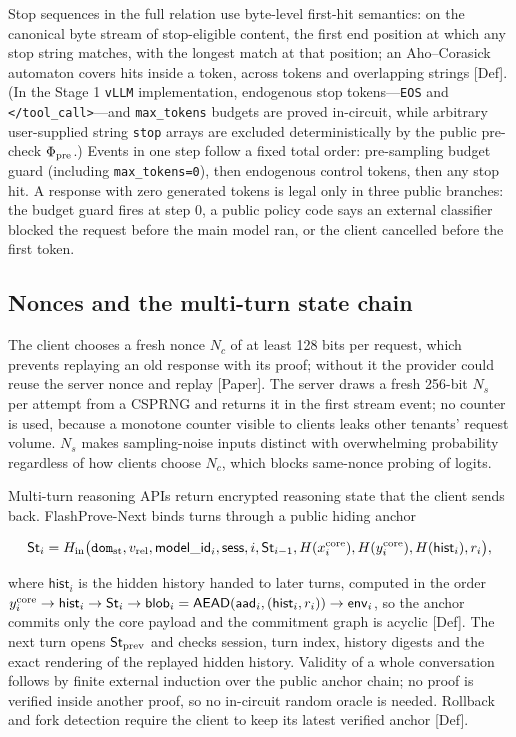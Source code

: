 \documentclass[10pt]{article}
\begin{document}
Stop sequences in the full relation use byte-level first-hit semantics: on the canonical byte stream of stop-eligible content, the first end position at which any stop string matches, with the longest match at that position; an Aho--Corasick automaton covers hits inside a token, across tokens and overlapping strings [Def]. (In the Stage 1 \texttt{vLLM} implementation, endogenous stop tokens---\texttt{EOS} and \texttt{</tool\_\allowbreak{}call>}---and \texttt{max\_\allowbreak{}tokens} budgets are proved in-circuit, while arbitrary user-supplied string \texttt{stop} arrays are excluded deterministically by the public pre-check $\Phi_{\rm pre}$.) Events in one step follow a fixed total order: pre-sampling budget guard (including \texttt{max\_\allowbreak{}tokens=0}), then endogenous control tokens, then any stop hit. A response with zero generated tokens is legal only in three public branches: the budget guard fires at step 0, a public policy code says an external classifier blocked the request before the main model ran, or the client cancelled before the first token.

\subsection{Nonces and the multi-turn state chain}
The client chooses a fresh nonce $N_c$ of at least 128 bits per request, which prevents replaying an old response with its proof; without it the provider could reuse the server nonce and replay [Paper]. The server draws a fresh 256-bit $N_s$ per attempt from a CSPRNG and returns it in the first stream event; no counter is used, because a monotone counter visible to clients leaks other tenants' request volume. $N_s$ makes sampling-noise inputs distinct with overwhelming probability regardless of how clients choose $N_c$, which blocks same-nonce probing of logits.

Multi-turn reasoning APIs return encrypted reasoning state that the client sends back. FlashProve-Next binds turns through a public hiding anchor

\[\mathsf{St}_i=H_{\rm in}\big(\texttt{dom}_{\rm st},v_{\rm rel},\mathsf{model\_id}_i,\mathsf{sess},i,\mathsf{St}_{i-1},H(x^{\rm core}_i),H(y^{\rm core}_i),H(\mathsf{hist}_i),r_i\big),\]

where $\mathsf{hist}_i$ is the hidden history handed to later turns, computed in the order $y^{\rm core}_i\to\mathsf{hist}_i\to\mathsf{St}_i\to\mathsf{blob}_i=\mathsf{AEAD}(\mathsf{aad}_i,(\mathsf{hist}_i,r_i))\to\mathsf{env}_i$, so the anchor commits only the core payload and the commitment graph is acyclic [Def]. The next turn opens $\mathsf{St}_{\rm prev}$ and checks session, turn index, history digests and the exact rendering of the replayed hidden history. Validity of a whole conversation follows by finite external induction over the public anchor chain; no proof is verified inside another proof, so no in-circuit random oracle is needed. Rollback and fork detection require the client to keep its latest verified anchor [Def].
\end{document}
